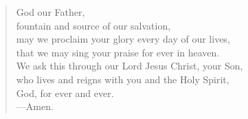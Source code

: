 \prayer

\setlength{\vleftmargin}{\prayerleftmargini}

\begin{verse}
God our Father,\\
fountain and source of our salvation,\\
may we proclaim your glory every day of our lives,\\
that we may sing your praise for ever in heaven.\\
We ask this through our Lord Jesus Christ, your Son,\\
who lives and reigns with you and the Holy Spirit,\\
God, for ever and ever.\\
{\color{red}---\thinspace}Amen.
\end{verse}

\setlength{\vleftmargin}{\defleftmargini}